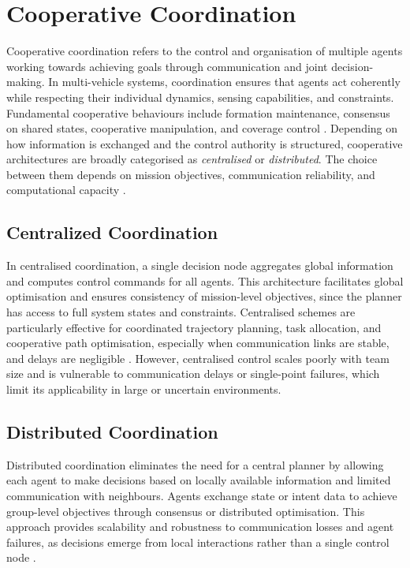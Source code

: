 \section{Cooperative Coordination}
Cooperative coordination refers to the control and organisation of multiple agents working towards achieving goals through communication and joint decision-making.
In multi-vehicle systems, coordination ensures that agents act coherently while respecting their individual dynamics, sensing capabilities, and constraints. 
Fundamental cooperative behaviours include formation maintenance, consensus on shared states, cooperative manipulation, and coverage control \cite{renDistributedConsensusMultiVehicle2010,olfati-saberConsensusCooperationNetworked2007}.
Depending on how information is exchanged and the control authority is structured, cooperative architectures are broadly categorised as \textit{centralised} or \textit{distributed}. 
The choice between them depends on mission objectives, communication reliability, and computational capacity \cite{caoOverviewRecentProgress2013,beardSmallUnmannedAircraft2012}.

\subsection{Centralized Coordination}

In centralised coordination, a single decision node aggregates global information and computes control commands for all agents.
This architecture facilitates global optimisation and ensures consistency of mission-level objectives, since the planner has access to full system states and constraints.
Centralised schemes are particularly effective for coordinated trajectory planning, task allocation, and cooperative path optimisation, especially when communication links are stable, and delays are negligible \cite{renDistributedConsensusMultiVehicle2010,beardSmallUnmannedAircraft2012}.
However, centralised control scales poorly with team size and is vulnerable to communication delays or single-point failures, which limit its applicability in large or uncertain environments.

\subsection{Distributed Coordination}

Distributed coordination eliminates the need for a central planner by allowing each agent to make decisions based on locally available information and limited communication with neighbours.
Agents exchange state or intent data to achieve group-level objectives through consensus or distributed optimisation.
This approach provides scalability and robustness to communication losses and agent failures, as decisions emerge from local interactions rather than a single control node \cite{olfati-saberConsensusProblemsNetworks2004,renDistributedConsensusMultiVehicle2010}.

